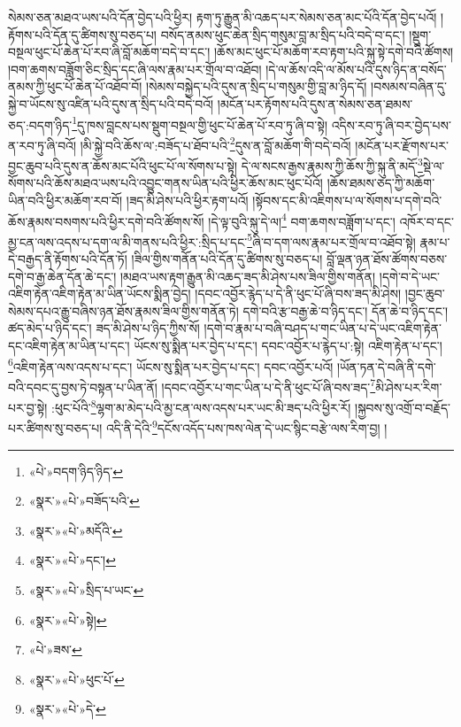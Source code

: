 སེམས་ཅན་མཐའ་ཡས་པའི་དོན་བྱེད་པའི་ཕྱིར། རྟག་ཏུ་རྒྱུན་མི་འཆད་པར་སེམས་ཅན་མང་པོའི་དོན་བྱེད་པའོ། །རྟོགས་པའི་དོན་དུ་ཚིགས་སུ་བཅད་པ། བསོད་ནམས་ཕུང་ཆེན་སྲིད་གསུམ་བླ་མ་སྲིད་པའི་བདེ་བ་དང་། །སྡུག་བསྔལ་ཕུང་པོ་ཆེན་པོ་རབ་ཞི་བློ་མཆོག་བདེ་བ་དང་། །ཆོས་མང་ཕུང་པོ་མཆོག་རབ་རྟག་པའི་སྐུ་སྟེ་དགེ་བའི་ཚོགས། །བག་ཆགས་བཟློག་ཅིང་སྲིད་དང་ཞི་ལས་རྣམ་པར་གྲོལ་བ་འཐོབ། །དེ་ལ་ཆོས་འདི་ལ་མོས་པའི་དུས་ཉིད་ན་བསོད་ནམས་ཀྱི་ཕུང་པོ་ཆེན་པོ་འཐོབ་བོ། །སེམས་བསྐྱེད་པའི་དུས་ན་སྲིད་པ་གསུམ་གྱི་བླ་མ་ཉིད་དོ། །བསམས་བཞིན་དུ་སྐྱེ་བ་ཡོངས་སུ་འཛིན་པའི་དུས་ན་སྲིད་པའི་བདེ་བའོ། །མངོན་པར་རྟོགས་པའི་དུས་ན་སེམས་ཅན་ཐམས་ཅད་:བདག་ཉིད་\footnote{«པེ་»བདག་ཉིད་ཉིད་}དུ་ཁས་བླངས་པས་སྡུག་བསྔལ་གྱི་ཕུང་པོ་ཆེན་པོ་རབ་ཏུ་ཞི་བ་སྟེ། འདིས་རབ་ཏུ་ཞི་བར་བྱེད་པས་ན་རབ་ཏུ་ཞི་བའོ། །མི་སྐྱེ་བའི་ཆོས་ལ་:བཟོད་པ་ཐོབ་པའི་\footnote{«སྣར་»«པེ་»བཟོད་པའི་}དུས་ན་བློ་མཆོག་གི་བདེ་བའོ། །མངོན་པར་རྫོགས་པར་བྱང་ཆུབ་པའི་དུས་ན་ཆོས་མང་པོའི་ཕུང་པོ་ལ་སོགས་པ་སྟེ། དེ་ལ་སངས་རྒྱས་རྣམས་ཀྱི་ཆོས་ཀྱི་སྐུ་ནི་མདོ་\footnote{«སྣར་»«པེ་»མདོའི་}སྡེ་ལ་སོགས་པའི་ཆོས་མཐའ་ཡས་པའི་འབྱུང་གནས་ཡིན་པའི་ཕྱིར་ཆོས་མང་ཕུང་པོའོ། །ཆོས་ཐམས་ཅད་ཀྱི་མཆོག་ཡིན་བའི་ཕྱིར་མཆོག་རབ་བོ། །ཟད་མི་ཤེས་པའི་ཕྱིར་རྟག་པའོ། །སྟོབས་དང་མི་འཇིགས་པ་ལ་སོགས་པ་དགེ་བའི་ཆོས་རྣམས་བསགས་པའི་ཕྱིར་དགེ་བའི་ཚོགས་སོ། །དེ་ལྟ་བུའི་སྐུ་དེ་ལ།\footnote{«སྣར་»«པེ་»དང་།} བག་ཆགས་བཟློག་པ་དང་། འཁོར་བ་དང་མྱ་ངན་ལས་འདས་པ་དག་ལ་མི་གནས་པའི་ཕྱིར་:སྲིད་པ་དང་\footnote{«སྣར་»«པེ་»སྲིད་པ་ཡང་}ཞི་བ་དག་ལས་རྣམ་པར་གྲོལ་བ་འཐོབ་སྟེ། རྣམ་པ་དེ་བརྒྱད་ནི་རྟོགས་པའི་དོན་ཏོ། །ཟིལ་གྱིས་གནོན་པའི་དོན་དུ་ཚིགས་སུ་བཅད་པ། བློ་ལྡན་ཉན་ཐོས་ཚོགས་བཅས་དགེ་བ་རྒྱ་ཆེན་དོན་ཆེ་དང་། །མཐའ་ཡས་རྟག་རྒྱུན་མི་འཆད་ཟད་མི་ཤེས་པས་ཟིལ་གྱིས་གནོན། །དགེ་བ་དེ་ཡང་འཇིག་རྟེན་འཇིག་རྟེན་མ་ཡིན་ཡོངས་སྨིན་བྱེད། །དབང་འབྱོར་རྙེད་པ་དེ་ནི་ཕུང་པོ་ཞི་བས་ཟད་མི་ཤེས། །བྱང་ཆུབ་སེམས་དཔའ་རྒྱུ་བཞིས་ཉན་ཐོས་རྣམས་ཟིལ་གྱིས་གནོན་ཏེ། དགེ་བའི་རྩ་བརྒྱ་ཆེ་བ་ཉིད་དང་། དོན་ཆེ་བ་ཉིད་དང་། ཚད་མེད་པ་ཉིད་དང་། ཟད་མི་ཤེས་པ་ཉིད་ཀྱིས་སོ། །དགེ་བ་རྣམ་པ་བཞི་བཤད་པ་གང་ཡིན་པ་དེ་ཡང་འཇིག་རྟེན་དང་འཇིག་རྟེན་མ་ཡིན་པ་དང་། ཡོངས་སུ་སྨིན་པར་བྱེད་པ་དང་། དབང་འབྱོར་པ་རྙེད་པ་:སྟེ། འཇིག་རྟེན་པ་དང་། \footnote{«སྣར་»«པེ་»སྟེ།  }འཇིག་རྟེན་ལས་འདས་པ་དང་། ཡོངས་སུ་སྨིན་པར་བྱེད་པ་དང་། དབང་འབྱོར་པའོ། །ཡོན་ཏན་དེ་བཞི་ནི་དགེ་བའི་དབང་དུ་བྱས་ཏེ་བསྟན་པ་ཡིན་ནོ། །དབང་འབྱོར་པ་གང་ཡིན་པ་དེ་ནི་ཕུང་པོ་ཞི་བས་ཟད་\footnote{«པེ་»ཟས་}མི་ཤེས་པར་རིག་པར་བྱ་སྟེ། :ཕུང་པོའི་\footnote{«སྣར་»«པེ་»ཕུང་པོ་}ལྷག་མ་མེད་པའི་མྱ་ངན་ལས་འདས་པར་ཡང་མི་ཟད་པའི་ཕྱིར་རོ། །སྐྱབས་སུ་འགྲོ་བ་བརྗོད་པར་ཚིགས་སུ་བཅད་པ། འདི་ནི་དེའི་\footnote{«སྣར་»«པེ་»དེ་}དངོས་འདོད་པས་ཁས་ལེན་དེ་ཡང་སྙིང་བརྩེ་ལས་རིག་བྱ། །
